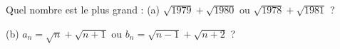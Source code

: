 Quel nombre est le plus grand : (a) $\sqrt{1979} + \sqrt{1980}$ ou $\sqrt{1978} + \sqrt{1981}$ ?

(b) $a_n = \sqrt{n} + \sqrt{n + 1}$ ou $b_n = \sqrt{n - 1} + \sqrt{n + 2}$ ?
